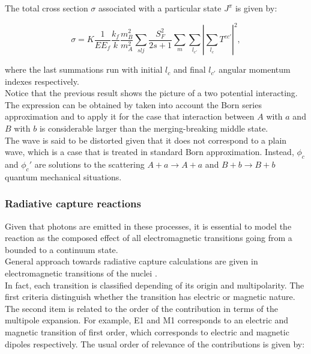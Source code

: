 \documentclass[openany]{book}
\begin{document}
The total cross section $\sigma$ associated with a particular state $J^{\pi}$ is given by: 

\begin{equation} \label{eq:exchange_crossSection}
	\sigma = K \frac{1}{E E_f} \frac{k_f}{k} \frac{m^2_B}{m^2_A} \sum_{slj} { \frac{S^2_F}{2s + 1}\sum_{m} \sum_{l_{c'}} \left|\sum_{l_{c}} T^{cc'}\right|^2},
\end{equation}

where the last summations run with initial $l_{c}$ and final $l_{c'}$ angular momentum indexes respectively. \\

Notice that the previous result shows the picture of a two potential interacting. The expression can be obtained by taken into account the Born series approximation and to apply it for the case that interaction between $A$ with $a$ and $B$ with $b$ is considerable larger than the merging-breaking middle state. \\

The wave is said to be distorted given that it does not correspond to a plain wave, which is a case that is treated in standard Born approximation. Instead,  $\phi_c $ and $\phi_c'$ are solutions to the scattering $A + a \rightarrow A + a$ and $B + b \rightarrow B + b$ quantum mechanical situations. \\
 
\subsubsection{Radiative capture reactions}   \label{ssub:potential_calculations_radiativeCapture}

Given that photons are emitted in these processes, it is essential to model the reaction as the composed effect of  all electromagnetic transitions going from a bounded to a continuum state.  \\

General approach towards radiative capture calculations are given in electromagnetic transitions of the nuclei \cite{goldhaber_weneser_1955}.\\

In fact, each transition is classified depending of its origin and multipolarity. The first criteria distinguish whether the transition has electric or magnetic nature. The second item is related to the order of the contribution in terms of the multipole expansion. For example, E1 and M1 corresponds to an electric and magnetic transition of first order, which corresponds to electric and magnetic dipoles respectively. The usual order of relevance of the contributions is given by: 
\end{document}
